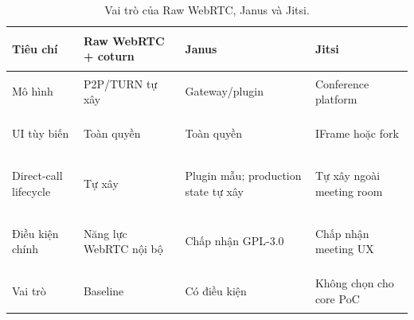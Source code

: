 \begin{table}[H]
\centering
\footnotesize
\begin{tabularx}{\textwidth}{|>{\bfseries\raggedright\arraybackslash}p{}|>{\raggedright\arraybackslash}X|>{\raggedright\arraybackslash}X|>{\raggedright\arraybackslash}X|}
\hline
Tiêu chí & Raw WebRTC + coturn & Janus & Jitsi \\
\hline
Mô hình & P2P/TURN tự xây & Gateway/plugin & Conference platform \\
\hline
UI tùy biến & Toàn quyền & Toàn quyền & IFrame hoặc fork \\
\hline
Direct-call lifecycle & Tự xây & Plugin mẫu; production state tự xây & Tự xây ngoài meeting room \\
\hline
Điều kiện chính & Năng lực WebRTC nội bộ & Chấp nhận GPL-3.0 & Chấp nhận meeting UX \\
\hline
Vai trò & Baseline & Có điều kiện & Không chọn cho core PoC \\
\hline
\end{tabularx}
\caption{Vai trò của Raw WebRTC, Janus và Jitsi.}
\label{tab:other-candidates}
\end{table}
